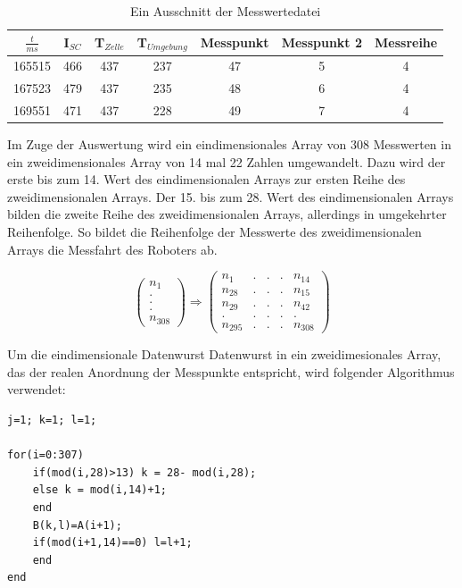 \documentclass[a4paper,bibtotoc,oneside]{scrbook}
\begin{document}
\begin{table}[htbp]
\centering
\begin{tabular}{ | c | c | c | c | c | c | c | } 
\hline
$\frac{t}{ms}$ & I$_{SC}$ & T$_{Zelle}$ & T$_{Umgebung}$ & Messpunkt & Messpunkt 2 & Messreihe \\
\hline
\hline
{165515} & {466} & {437} & {237} & {47} & {5} & {4} \\
\hline
{167523} & {479} & {437} & {235} & {48} & {6} & {4} \\
\hline
{169551} & {471} & {437} & {228} & {49} & {7} & {4} \\
\hline
\end{tabular}
\caption{Ein Ausschnitt der Messwertedatei}\label{TabSD}
\end{table}

Im Zuge der Auswertung wird ein eindimensionales Array von 308 Messwerten in ein zweidimensionales Array von 14 mal 22 Zahlen umgewandelt. Dazu wird der erste bis zum 14. Wert des eindimensionalen Arrays zur ersten Reihe des zweidimensionalen Arrays. Der 15. bis zum 28. Wert des eindimensionalen Arrays bilden die zweite Reihe des zweidimensionalen Arrays, allerdings in umgekehrter Reihenfolge. So bildet die Reihenfolge der Messwerte des zweidimensionalen Arrays die Messfahrt des Roboters ab.
\newline

\begin{equation}
\begin{pmatrix}
n_1 \\ . \\ . \\ . \\ n_{308} 
\end{pmatrix}
\Longrightarrow
\begin{pmatrix}
n_{1}  & . &.& .& n_{14} \\
n_{28} & .& .& . &n_{15}  \\
n_{29}  &. &.& .& n_{42}  \\
. &.& .& . & . \\
n_{295}  &.& .&.& n_{308} 
\end{pmatrix}
\end{equation}

Um die eindimensionale Datenwurst Datenwurst in ein zweidimesionales Array, das der realen Anordnung der Messpunkte entspricht, wird folgender Algorithmus verwendet:
\begin{verbatim}
j=1; k=1; l=1;

for(i=0:307)
    if(mod(i,28)>13) k = 28- mod(i,28);
    else k = mod(i,14)+1;
    end
    B(k,l)=A(i+1);
    if(mod(i+1,14)==0) l=l+1;
    end
end
\end{verbatim}
\end{document}
